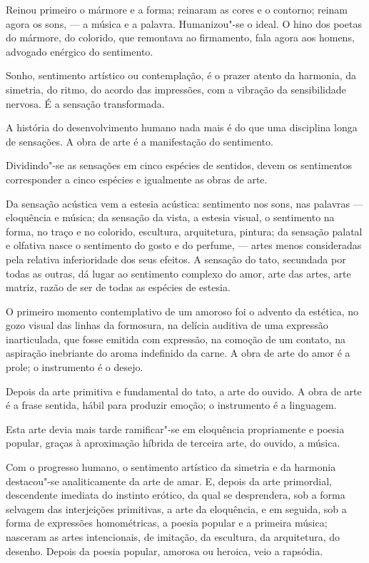 Reinou primeiro o mármore e a forma; reinaram as cores e o
contorno; reinam agora os sons, --- a música e a palavra.
Humanizou"-se o ideal. O hino dos poetas do mármore, do colorido, que
remontava ao firmamento, fala agora aos homens, advogado enérgico do
sentimento. 

Sonho, sentimento artístico ou contemplação, é o prazer
atento da harmonia, da simetria, do ritmo, do acordo das impressões,
com a vibração da sensibilidade nervosa. É a sensação transformada.

A história do desenvolvimento humano nada mais é do que uma disciplina
longa de sensações. A obra de arte é a manifestação do sentimento.

Dividindo"-se as sensações em cinco espécies de sentidos, devem os
sentimentos corresponder a cinco espécies e igualmente as obras de
arte. 

Da sensação acústica vem a estesia acústica: sentimento nos sons,
nas palavras --- eloquência e música; da sensação da vista, a estesia
visual, o sentimento na forma, no traço e no colorido, escultura,
arquitetura, pintura; da sensação palatal e olfativa nasce o sentimento
do gosto e do perfume, --- artes menos consideradas pela relativa
inferioridade dos seus efeitos. A sensação do tato, secundada por todas
as outras, dá lugar ao sentimento complexo do amor, arte das artes,
arte matriz, razão de ser de todas as espécies de estesia. 

O primeiro
momento contemplativo de um amoroso foi o advento da estética, no gozo
visual das linhas da formosura, na delícia auditiva de uma expressão
inarticulada, que fosse emitida com expressão, na comoção de um
contato, na aspiração inebriante do aroma indefinido da carne. A obra
de arte do amor é a prole; o instrumento é o desejo. 

Depois da arte
primitiva e fundamental do tato, a arte do ouvido. A obra de arte é a
frase sentida, hábil para produzir emoção; o instrumento é a linguagem.

Esta arte devia mais tarde ramificar"-se em eloquência propriamente e
poesia popular, graças à aproximação híbrida de terceira arte, do
ouvido, a música. 

Com o progresso humano, o sentimento artístico da
simetria e da harmonia destacou"-se analiticamente da arte de amar. E,
depois da arte primordial, descendente imediata do instinto erótico, da
qual se desprendera, sob a forma selvagem das interjeições primitivas,
a arte da eloquência, e em seguida, sob a forma de expressões
homométricas, a poesia popular e a primeira música; nasceram as artes
intencionais, de imitação, da escultura, da arquitetura, do desenho.
Depois da poesia popular, amorosa ou heroica, veio a rapsódia. 


